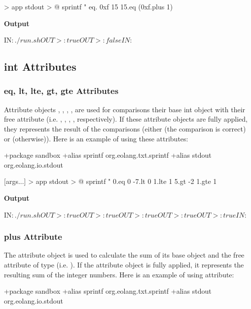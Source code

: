 \documentclass[12pt]{book}
\begin{document}
{\begin{ffcode}
[args...] > app
  stdout > @
  sprintf
    "%
    eq.
      0xf
      15
    15.eq (0xf.plus 1)
\end{ffcode}
\textbf{Output}
\begin{ffcode}
IN$: ./run.sh
OUT>: true
OUT>: false
IN$: 
\end{ffcode}

\subsection{int Attributes}

\subsubsection{eq, lt, lte, gt, gte Attributes} \label{subsubsec:comp-attrs}
Attribute objects , , , ,  are used for comparisons their base int object with their  free attribute (i.e. , , , ,  respectively).
If these attribute objects are fully applied, they represents the result of the comparisons (either  (the comparison is correct) or  (otherwise)). Here is an example of using these attributes:

\begin{ffcode}
+package sandbox
+alias sprintf org.eolang.txt.sprintf
+alias stdout org.eolang.io.stdout

[args...] > app
  stdout > @
    sprintf
      "%
      0.eq 0
      -7.lt 0
      1.lte 1
      5.gt -2
      1.gte 1
\end{ffcode}
\textbf{Output}
\begin{ffcode}
IN$: ./run.sh
OUT>: true
OUT>: true
OUT>: true
OUT>: true
OUT>: true
IN$: 
\end{ffcode}

\subsubsection{plus Attribute} 
The  attribute object is used to calculate the sum of its base  object and the free attribute  of type  (i.e. ).
If the  attribute object is fully applied, it represents the resulting sum of the integer numbers. Here is an example of using  attribute:

\begin{ffcode}
+package sandbox
+alias sprintf org.eolang.txt.sprintf
+alias stdout org.eolang.io.stdout


\end{ffcode}}
\end{document}

